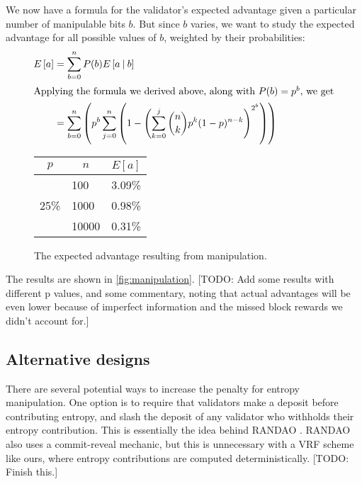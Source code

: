 We now have a formula for the validator's expected advantage given a particular number of manipulable bits $b$. But since $b$ varies, we want to study the expected advantage for all possible values of $b$, weighted by their probabilities:
\begin{align*}
  E\left[ a \right] &= \sum_{b=0}^{n} P(b) E\left[ a \mathbin{\vert} b \right] \\
  \intertext{Applying the formula we derived above, along with $P(b) = p^b$, we get}
  &= \sum_{b=0}^{n} \left( p^b \sum_{j=0}^{n} \left( 1 - \left( \sum_{k=0}^{j} \binom{n}{k} p^k (1-p)^{n-k} \right)^{2^b} \right) \right)
\end{align*}

\begin{wrapfigure}{r}{.45\textwidth}
  \begin{tabularx}{.45\textwidth}{|X|X|X|}
    \hline
    \multicolumn{1}{|c|}{$p$} & \multicolumn{1}{|c|}{$n$} & \multicolumn{1}{|c|}{$E[a]$} \\
    \hline
    \multirow{3}{*}{25\%}
    & 100 & 3.09\% \\
    \cline{2-3}
    & 1000 & 0.98\% \\
    \cline{2-3}
    & 10000 & 0.31\% \\
    \hline
  \end{tabularx}
  \caption{The expected advantage resulting from manipulation.}
  \label{fig:manipulation}
\end{wrapfigure}

The results are shown in \autoref{fig:manipulation}. [TODO: Add some results with different p values, and some commentary, noting that actual advantages will be even lower because of imperfect information and the missed block rewards we didn't account for.]

\subsection{Alternative designs}

There are several potential ways to increase the penalty for entropy manipulation. One option is to require that validators make a deposit before contributing entropy, and slash the deposit of any validator who withholds their entropy contribution. This is essentially the idea behind RANDAO \cite{randao}. RANDAO also uses a commit-reveal mechanic, but this is unnecessary with a VRF scheme like ours, where entropy contributions are computed deterministically. [TODO: Finish this.]

